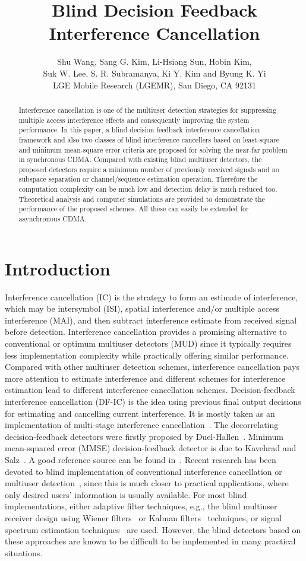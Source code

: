 \documentclass[a4paper,10pt,fleqn, twocolumn]{IEEETran}
\title{Blind Decision Feedback Interference Cancellation}
\author{Shu Wang, Sang G. Kim, Li-Hsiang Sun, Hobin Kim,\\
   Suk W. Lee, S. R. Subramanya, Ki Y. Kim and Byung K. Yi\\ LGE Mobile Research (LGEMR), San Diego, CA 92131}
\date{}
\begin{document}
\maketitle
\begin{abstract}\small
Interference cancellation is one of the multiuser detection
strategies for suppressing multiple access interference effects
and consequently improving the system performance. In this paper,
a blind decision feedback interference cancellation framework and
also two classes of blind interference cancellers based on
least-square and minimum mean-square error criteria are proposed
for solving the near-far problem in synchronous CDMA. Compared
with existing blind multiuser detectors, the proposed detectors
require a minimum number of previously received signals and no
subspace separation or channel/sequence estimation operation.
Therefore the computation complexity can be much low and detection
delay is much reduced too. Theoretical analysis and computer
simulations are provided to demonstrate the performance of the
proposed schemes. All these can easily be extended for
asynchronous CDMA.
\end{abstract}
\section{Introduction}
Interference cancellation (IC) is the strategy to form an estimate
of interference, which may be intersymbol (ISI), spatial
interference and/or multiple access interference (MAI), and then
subtract interference estimate from received signal before
detection. Interference cancellation provides a promising
alternative to conventional or optimum multiuser detectors (MUD)
since it typically requires less implementation complexity while
practically offering similar performance. Compared with other
multiuser detection schemes, interference cancellation pays more
attention to estimate interference and different schemes for
interference estimation lead to different interference
cancellation schemes. Decision-feedback interference cancellation
(DF-IC) is the idea using previous final output decisions for
estimating and cancelling current interference. It is mostly taken
as an implementation of multi-stage interference
cancellation~\cite{Verd98}. The decorrelating decision-feedback
detectors were firstly proposed by
Duel-Hallen~\cite{Duel93,Duel95}. Minimum mean-squared error
(MMSE) decision-feedback detector is due to Kavehrad and
Salz~\cite{Kave85}. A good reference source can be found
in~\cite{Verd98}. Recent research has been devoted to blind
implementation of conventional interference cancellation or
multiuser detection~\cite{Madh94,Wang98,Wang99,Zhang02}, since
this is much closer to practical applications, where only desired
users' information is usually available. For most blind
implementations, either adaptive filter techniques, e.g., the
blind multiuser receiver design using Wiener filters~\cite{Madh94}
or Kalman filters~\cite{Zhang02} techniques, or signal spectrum
estimation techniques~\cite{Wang98,Wang99} are used. However, the
blind detectors based on these approaches are known to be
difficult to be implemented in many practical situations.
\end{document}
